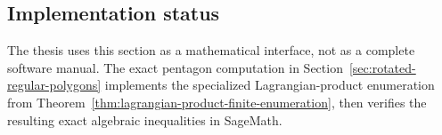 \subsection{Implementation status}
\label{subsec:quadratic-program-algorithm-hk2019-implementation-status}

The thesis uses this section as a mathematical interface, not as a complete
software manual. The exact pentagon computation in
Section~\ref{sec:rotated-regular-polygons} implements the specialized
Lagrangian-product enumeration from
Theorem~\ref{thm:lagrangian-product-finite-enumeration}, then verifies the
resulting exact algebraic inequalities in SageMath.
